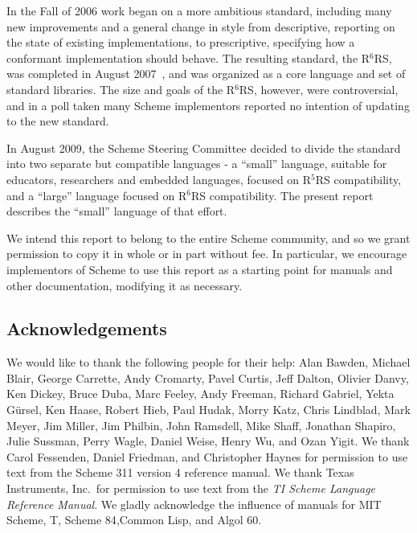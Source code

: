 In the Fall of 2006 work began on a more ambitious standard, including
many new improvements and a general change in style from descriptive,
reporting on the state of existing implementations, to prescriptive,
specifying how a conformant implementation should behave.  The
resulting standard, the R$^{6}$RS, was completed in August
2007~\cite{R6RS}, and was organized as a core language and set of
standard libraries.  The size and goals of the R$^{6}$RS, however,
were controversial, and in a poll taken many Scheme implementors
reported no intention of updating to the new standard.

In August 2009, the Scheme Steering Committee decided to divide the
standard into two separate but compatible languages - a ``small''
language, suitable for educators, researchers and embedded languages,
focused on R$^{5}$RS compatibility, and a ``large'' language focused
on R$^{6}$RS compatibility.  The present report describes the
``small'' language of that effort.




\medskip

We intend this report to belong to the entire Scheme community, and so
we grant permission to copy it in whole or in part without fee.  In
particular, we encourage implementors of Scheme to use this report as
a starting point for manuals and other documentation, modifying it as
necessary.




\subsection*{Acknowledgements}

We would like to thank the following people for their help: Alan Bawden, Michael
Blair, George Carrette, Andy Cromarty, Pavel Curtis, Jeff Dalton, Olivier Danvy,
Ken Dickey, Bruce Duba, Marc Feeley,
Andy Freeman, Richard Gabriel, Yekta G\"ursel, Ken Haase, Robert
Hieb, Paul Hudak, Morry Katz, Chris Lindblad, Mark Meyer, Jim Miller, Jim Philbin,
John Ramsdell, Mike Shaff, Jonathan Shapiro, Julie Sussman,
Perry Wagle, Daniel Weise, Henry Wu, and Ozan Yigit.
We thank Carol Fessenden, Daniel
Friedman, and Christopher Haynes for permission to use text from the Scheme 311
version 4 reference manual.  We thank Texas Instruments, Inc.~for permission to
use text from the {\em TI Scheme Language Reference Manual}\cite{TImanual85}.
We gladly acknowledge the influence of manuals for MIT Scheme\cite{MITScheme},
T\cite{Rees84}, Scheme 84\cite{Scheme84},Common Lisp\cite{CLtL},
and Algol 60\cite{Naur63}.

